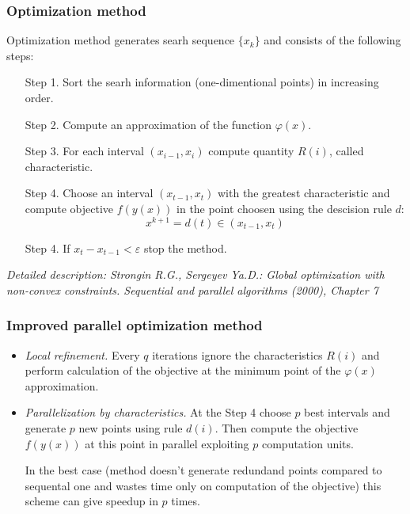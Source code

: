 \documentclass[aspectratio=1610]{beamer}
\begin{document}
\begin{frame}
  \frametitle{Optimization method}
Optimization method generates searh sequence \(\{x_k\}\) and consists of the following steps:
\begin{enumerate}
  \setlength{\itemindent}{.1in}
  \item[Step 1.] Sort the searh information (one-dimentional points) in increasing order.
  \item[Step 2.] Compute an approximation of the function \(\varphi(x)\).
  \item[Step 3.] For each interval \((x_{i-1}, x_i)\) compute quantity \(R(i)\), called characteristic.
  \item[Step 4.] Choose an interval \((x_{t-1}, x_t)\) with the greatest characteristic and
  compute objective \(f(y(x))\) in the point choosen using the descision rule \(d\):
  \begin{displaymath}
    x^{k+1}=d(t)\in (x_{t-1}, x_t)
  \end{displaymath}
  \item[Step 4.] If \(x_{t}-x_{t-1}<\varepsilon\) stop the method.
\end{enumerate}
\textit{\footnotesize	{Detailed description: Strongin R.G., Sergeyev Ya.D.: Global optimization with non-convex constraints. Sequential and parallel algorithms (2000), Chapter 7}}
\end{frame}

\begin{frame}
  \frametitle{Improved parallel optimization method}
  \begin{itemize}
    \item
    \textit{Local refinement.} Every \(q\) iterations ignore the characteristics \(R(i)\)
    and perform calculation of the objective at the minimum point of the \(\varphi(x)\) approximation.
    \item
    \textit{Parallelization by characteristics.} At the Step 4 choose \(p\) best intervals
    and generate \(p\) new points using rule \(d(i)\). Then compute the objective \(f(y(x))\) at this
    point in parallel exploiting \(p\) computation units.

    \enspace
    In the best case (method doesn't generate redundand points compared to sequental
    one and wastes time only on computation of the objective)
    this scheme can give speedup in \(p\) times.
  \end{itemize}

\end{frame}
\end{document}
